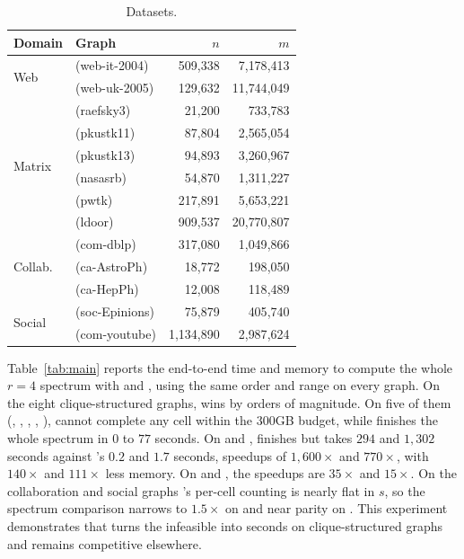 \begin{table}[t]
\centering
\caption{Datasets.}
\label{tab:datasets}
\small
\begin{tabular}{llrr}
\toprule
Domain & Graph & $n$ & $m$ \\
\midrule
\multirow{2}{*}{Web}
 & \daWIT{} (web-it-2004)   & 509{,}338   & 7{,}178{,}413 \\
 & \daWUK{} (web-uk-2005)   & 129{,}632   & 11{,}744{,}049 \\
\midrule
\multirow{6}{*}{Matrix}
 & \daRAE{} (raefsky3)      & 21{,}200    & 733{,}783 \\
 & \daPKb{} (pkustk11)      & 87{,}804    & 2{,}565{,}054 \\
 & \daPKa{} (pkustk13)      & 94{,}893    & 3{,}260{,}967 \\
 & \daNAS{} (nasasrb)       & 54{,}870    & 1{,}311{,}227 \\
 & \daPWT{} (pwtk)          & 217{,}891   & 5{,}653{,}221 \\
 & \daLDR{} (ldoor)         & 909{,}537   & 20{,}770{,}807 \\
\midrule
\multirow{3}{*}{Collab.}
 & \daDBL{} (com-dblp)      & 317{,}080   & 1{,}049{,}866 \\
 & \daAST{} (ca-AstroPh)    & 18{,}772    & 198{,}050 \\
 & \daHEP{} (ca-HepPh)      & 12{,}008    & 118{,}489 \\
\midrule
\multirow{2}{*}{Social}
 & \daEPN{} (soc-Epinions)  & 75{,}879    & 405{,}740 \\
 & \daYTB{} (com-youtube)   & 1{,}134{,}890 & 2{,}987{,}624 \\
\bottomrule
\end{tabular}
\end{table}

Table~\ref{tab:main} reports the end-to-end time and memory to compute the whole $r{=}4$ spectrum with \specnd{} and \cnd, using the same order and range on every graph.
%
On the eight clique-structured graphs, \specnd{} wins by orders of magnitude.
%
On five of them (\daWIT, \daWUK, \daPKa, \daPWT, \daLDR), \cnd{} cannot complete any cell within the $300$GB budget, while \specnd{} finishes the whole spectrum in $0$ to $77$ seconds.
%
On \daRAE{} and \daPKb, \cnd{} finishes but takes $294$ and $1{,}302$ seconds against \specnd{}'s $0.2$ and $1.7$ seconds, speedups of $1{,}600\times$ and $770\times$, with $140\times$ and $111\times$ less memory.
%
On \daDBL{} and \daNAS, the speedups are $35\times$ and $15\times$.
%
On the collaboration and social graphs \cnd{}'s per-cell counting is nearly flat in $s$, so the spectrum comparison narrows to $1.5\times$ on \daAST{} and near parity on \daYTB.
%
This experiment demonstrates that \specnd{} turns the infeasible into seconds on clique-structured graphs and remains competitive elsewhere.

